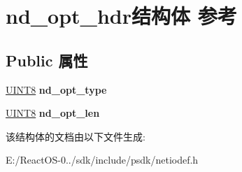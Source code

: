 \hypertarget{structnd__opt__hdr}{}\section{nd\+\_\+opt\+\_\+hdr结构体 参考}
\label{structnd__opt__hdr}
\subsection*{Public 属性}
\begin{DoxyCompactItemize}
\item 
\mbox{\label{structnd__opt__hdr_ac1975b99a3f12e6acad6dbc2288aff33}} 
\hyperlink{_processor_bind_8h_ab27e9918b538ce9d8ca692479b375b6a}{U\+I\+N\+T8} {\bfseries nd\+\_\+opt\+\_\+type}
\item 
\mbox{\label{structnd__opt__hdr_a0b87ceaa244c1740af740cfc34d6df0d}} 
\hyperlink{_processor_bind_8h_ab27e9918b538ce9d8ca692479b375b6a}{U\+I\+N\+T8} {\bfseries nd\+\_\+opt\+\_\+len}
\end{DoxyCompactItemize}


该结构体的文档由以下文件生成\+:\begin{DoxyCompactItemize}
\item 
E\+:/\+React\+O\+S-\/0../sdk/include/psdk/netiodef.\+h\end{DoxyCompactItemize}
